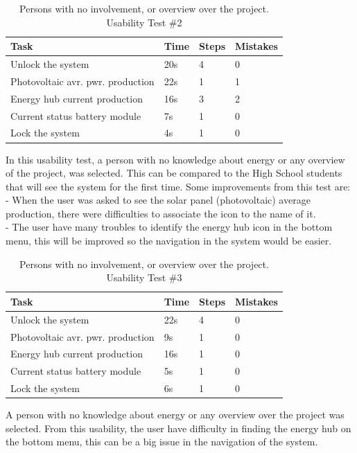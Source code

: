\begin{table}[H]
	\begin{tabular}{ | l | l | l | l |}
		\hline
		Task 					     & 		Time 	& 	Steps 	&	 Mistakes \\ \hline
		Unlock the system 			     & 		20s 		&	 4 		& 		0 	\\ \hline
		Photovoltaic avr. pwr. production  & 		22s 		& 	 1 		& 		1 	\\ \hline
		Energy hub current production 	     & 		16s 		& 	 3 		& 		2 	\\ \hline
		Current status battery module 	     & 		7s 		& 	 1 		& 		0 	\\ \hline
		Lock the system 			     & 		4s 		& 	 1 		& 		0 	\\ \hline
	\end{tabular}
     \caption{Persons with no involvement, or overview over the project. Usability Test \#2}
\end{table}
In this usability test, a person with no knowledge about energy or any overview of the project, was selected. This can be compared to the High School students that will see the system for the first time.\p
Some improvements from this test are:\\
- When the user was asked to see the solar panel (photovoltaic) average production, there were difficulties to associate the icon to the name of it.\\
- The user have many troubles to identify the energy hub icon in the bottom menu, this will be improved so the navigation in the system would be easier.\\

\begin{table}[H]
	\begin{tabular}{ | l | l | l | l |}
		\hline
		Task 					      & 	Time 	& 	Steps 	& 	Mistakes  \\ \hline
		Unlock the system 			      & 	22s 		& 	4 		& 	0 		\\ \hline
		Photovoltaic avr. pwr. production   & 	9s 		& 	1 		& 	0 		\\ \hline
		Energy hub current production 	      & 	16s 		& 	1 		& 	0 		\\ \hline
		Current status battery module 	      & 	5s 		& 	1 		& 	0 		\\ \hline
		Lock the system 			      & 	6s 		& 	1 		& 	0		\\ \hline
	\end{tabular}
    \caption{Persons with no involvement, or overview over the project. Usability Test \#3}
\end{table}
A person with no knowledge about energy or any overview over the project was selected. From this usability, the user have difficulty in finding the energy hub on the bottom menu, this can be a big issue in the navigation of the system. \p


